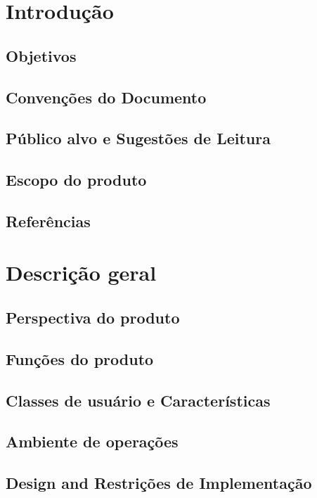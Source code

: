 \chapter{Introdução}
\label{ch:intro}

\section{Objetivos}
\section{Convenções do Documento}
\section{Público alvo e Sugestões de Leitura}
\section{Escopo do produto}
\section{Referências}


\chapter{Descrição geral}
\label{Descrição geral}

\section{Perspectiva do produto}

\section{Funções do produto}


\section{Classes de usuário e Características}


\section{Ambiente de operações}

\section{Design and Restrições de Implementação}

